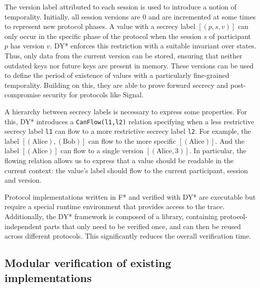 The version label attributed to each session is used to introduce a notion of temporality. Initially, all session versions are 0 and are incremented at some times to represent new protocol phases.
A value with a secrecy label $[(p,s,v)]$ can only occur in the specific phase of the protocol when the session $s$ of participant $p$ has version $v$.
DY* enforces this restriction with a suitable invariant over states. Thus, only data from the current version can be stored, ensuring that neither outdated keys nor future keys are present in memory.
These versions can be used to define the period of existence of values with a particularly fine-grained temporality.
Building on this, they are able to prove forward secrecy and post-compromise security for protocols like Signal.

A hierarchy between secrecy labels is necessary to express some properties. For this, DY* introduces a \texttt{CanFlow(l1,l2)} relation specifying when a less restrictive secrecy label \texttt{l1} can flow to a more restrictive secrecy label \texttt{l2}.
For example, the label $[(\text{Alice}), (\text{Bob})]$ can flow to the more specific $[(\text{Alice})]$. And the label $[(\text{Alice})]$ can flow to a single version $[(\text{Alice}, 3)]$.
In particular, the flowing relation allows us to express that a value should be readable in the current context: the value's label should flow to the current participant, session and version.

Protocol implementations written in F* and verified with DY* are executable but require a special runtime environment that provides access to the trace. Additionally, the DY* framework is composed of a library, containing protocol-independent parts that only need to be verified once, and can then be reused across different protocols. This significantly reduces the overall verification time.

\subsection{Modular verification of existing implementations}
\label{sec:modular-verification-of-existing-implementations}

